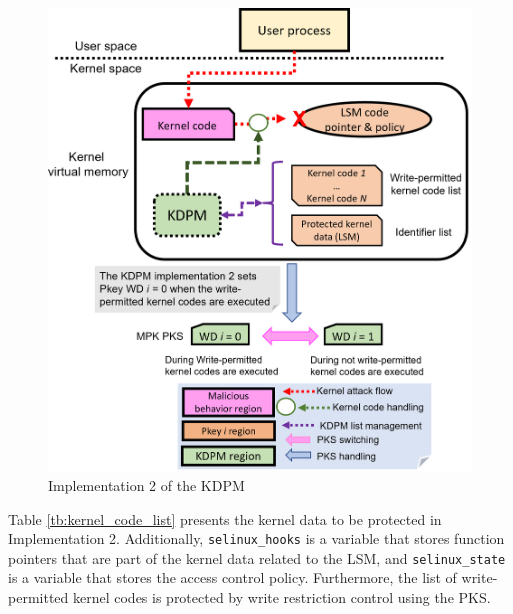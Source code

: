 \begin{figure}[t]
  \begin{center}
    \includegraphics[bb=0 0 547 597, scale=.350]{./imgs/005_screen_shot_2022-01-10_180226.png}
  \end{center}
  \caption{
    Implementation 2 of the KDPM
  }
 \label{fig:implementation2_overview}
\end{figure}


Table \ref{tb:kernel_code_list} presents the kernel data to be protected in
Implementation 2. Additionally, \verb|selinux_hooks| is a variable that stores function
pointers that are part of the kernel data related to the LSM, and
\verb|selinux_state| is a variable that stores the access control policy. Furthermore,
the list of write-permitted kernel codes is protected by write restriction
control using the PKS.


